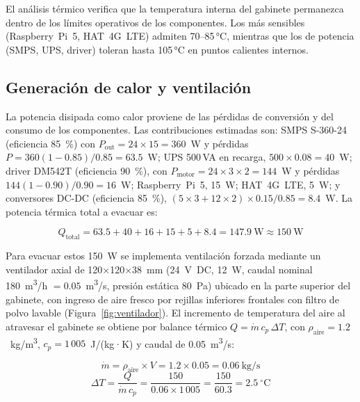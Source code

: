 El análisis térmico verifica que la temperatura interna del gabinete permanezca dentro de los límites operativos de los componentes. Los más sensibles (Raspberry~Pi~5, HAT~4G~LTE) admiten 70--85\,°C, mientras que los de potencia (SMPS, UPS, driver) toleran hasta 105\,°C en puntos calientes internos.

\subsection{Generación de calor y ventilación}\label{subsec:generacion-calor}

La potencia disipada como calor proviene de las pérdidas de conversión y del consumo de los componentes. Las contribuciones estimadas son: SMPS S-360-24 (eficiencia 85~\%) con $P_{\text{out}} = 24 \times 15 = 360$~W y pérdidas $P = 360(1-0.85)/0.85 = 63.5$~W; UPS 500\,VA en recarga, $500 \times 0.08 = 40$~W; driver DM542T (eficiencia 90~\%), con $P_{\text{motor}} = 24 \times 3 \times 2 = 144$~W y pérdidas $144(1-0.90)/0.90 = 16$~W; Raspberry~Pi~5, 15~W; HAT~4G~LTE, 5~W; y conversores DC-DC (eficiencia 85~\%), $(5\times3 + 12\times2)\times0.15/0.85 = 8.4$~W. La potencia térmica total a evacuar es:

\begin{equation}
Q_{\text{total}} = 63.5 + 40 + 16 + 15 + 5 + 8.4 = 147.9~\text{W} \approx 150~\text{W}
\end{equation}

Para evacuar estos 150~W se implementa ventilación forzada mediante un ventilador axial de 120$\times$120$\times$38~mm (24~V~DC, 12~W, caudal nominal 180~m\textsuperscript{3}/h $= 0.05$~m\textsuperscript{3}/s, presión estática 80~Pa) ubicado en la parte superior del gabinete, con ingreso de aire fresco por rejillas inferiores frontales con filtro de polvo lavable (Figura~\ref{fig:ventilador}). El incremento de temperatura del aire al atravesar el gabinete se obtiene por balance térmico $Q = \dot{m}\,c_p\,\Delta T$, con $\rho_{\text{aire}} = 1.2$~kg/m\textsuperscript{3}, $c_p = 1\,005$~J/(kg·K) y caudal de 0.05~m\textsuperscript{3}/s:

\begin{equation}
\dot{m} = \rho_{\text{aire}} \times V = 1.2 \times 0.05 = 0.06~\text{kg/s}
\end{equation}
\begin{equation}
\Delta T = \frac{Q}{\dot{m}\,c_p} = \frac{150}{0.06 \times 1\,005} = \frac{150}{60.3} = 2.5~^\circ\text{C}
\end{equation}

